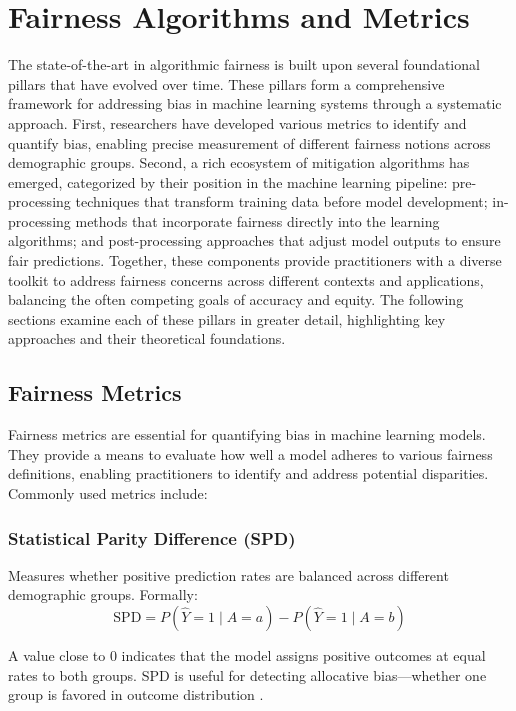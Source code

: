 \documentclass[12pt,a4paper,openright,twoside]{book}
\begin{document}
\section{Fairness Algorithms and Metrics}
The state-of-the-art in algorithmic fairness is built upon several foundational pillars that have evolved over time. These pillars form a comprehensive framework for addressing bias in machine learning systems through a systematic approach. First, researchers have developed various metrics to identify and quantify bias, enabling precise measurement of different fairness notions across demographic groups. Second, a rich ecosystem of mitigation algorithms has emerged, categorized by their position in the machine learning pipeline: pre-processing techniques that transform training data before model development; in-processing methods that incorporate fairness directly into the learning algorithms; and post-processing approaches that adjust model outputs to ensure fair predictions. Together, these components provide practitioners with a diverse toolkit to address fairness concerns across different contexts and applications, balancing the often competing goals of accuracy and equity. The following sections examine each of these pillars in greater detail, highlighting key approaches and their theoretical foundations.

\subsection{Fairness Metrics}
Fairness metrics are essential for quantifying bias in machine learning models. They provide a means to evaluate how well a model adheres to various fairness definitions, enabling practitioners to identify and address potential disparities. Commonly used metrics include:

\subsubsection{Statistical Parity Difference (SPD)} 
Measures whether positive prediction rates are balanced across different demographic groups. Formally:
\begin{equation}
    \text{SPD} = P(\hat{Y}=1 \mid A=a) - P(\hat{Y}=1 \mid A=b)
\end{equation}

A value close to 0 indicates that the model assigns positive outcomes at equal rates to both groups. SPD is useful for detecting allocative bias—whether one group is favored in outcome distribution \cite{dwork2011fairnessawareness}.
\end{document}

